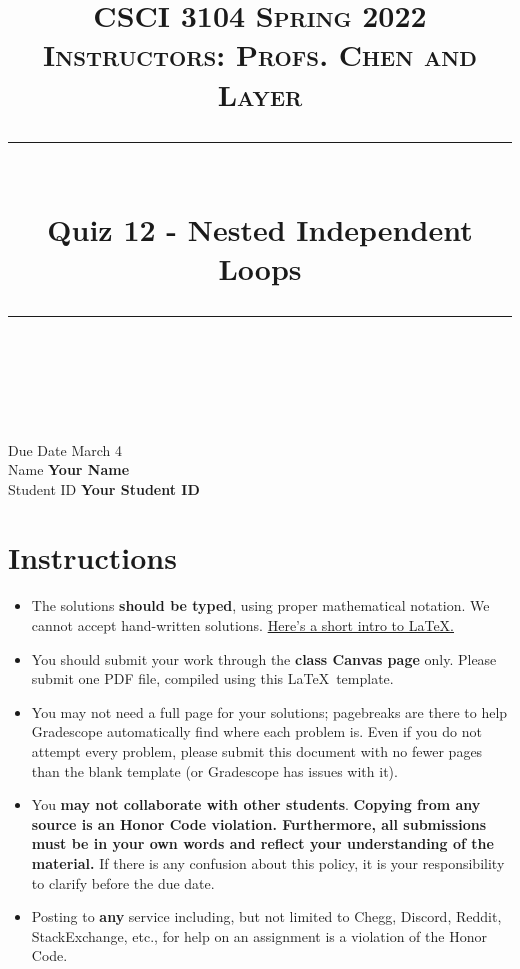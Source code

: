 \documentclass[11pt]{article}
\title{
\normalfont \normalsize 
\textsc{CSCI 3104 Spring 2022 \\ 
Instructors: Profs. Chen and Layer} \\
[10pt] 
\rule{\linewidth}{0.5pt} \\[6pt] 
\huge Quiz 12 -  Nested Independent Loops \\
\rule{\linewidth}{2pt}  \\[10pt]
}
\date{}
\theoremstyle{definition}
\theoremstyle{definition}
\theoremstyle{definition}
\begin{document}

\maketitle


\noindent
Due Date \dotfill March 4 \\
Name \dotfill \textbf{Your Name} \\
Student ID \dotfill \textbf{Your Student ID} \\


\tableofcontents

\section{Instructions}
 \begin{itemize}
	\item The solutions \textbf{should be typed}, using proper mathematical notation. We cannot accept hand-written solutions. \href{http://ece.uprm.edu/~caceros/latex/introduction.pdf}{Here's a short intro to \LaTeX.}
	\item You should submit your work through the \textbf{class Canvas page} only. Please submit one PDF file, compiled using this \LaTeX \ template.
	\item You may not need a full page for your solutions; pagebreaks are there to help Gradescope automatically find where each problem is. Even if you do not attempt every problem, please submit this document with no fewer pages than the blank template (or Gradescope has issues with it).

	\item You \textbf{may not collaborate with other students}. \textbf{Copying from any source is an Honor Code violation. Furthermore, all submissions must be in your own words and reflect your understanding of the material.} If there is any confusion about this policy, it is your responsibility to clarify before the due date. 

	\item Posting to \textbf{any} service including, but not limited to Chegg, Discord, Reddit, StackExchange, etc., for help on an assignment is a violation of the Honor Code.
\end{itemize}
\end{document}
